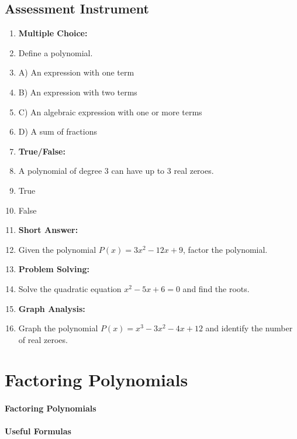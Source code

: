 \subsection{Assessment Instrument}

\begin{enumerate}
    \item \textbf{Multiple Choice:}
    \item Define a polynomial.
    \item A) An expression with one term
    \item B) An expression with two terms
    \item C) An algebraic expression with one or more terms
    \item D) A sum of fractions
    \item \textbf{True/False:}
    \item A polynomial of degree 3 can have up to 3 real zeroes.
    \item True
    \item False
    \item \textbf{Short Answer:}
    \item Given the polynomial \( P(x) = 3x^2 - 12x + 9 \), factor the polynomial.
    \item \textbf{Problem Solving:}
    \item Solve the quadratic equation \( x^2 - 5x + 6 = 0 \) and find the roots.
    \item \textbf{Graph Analysis:}
    \item Graph the polynomial \( P(x) = x^3 - 3x^2 - 4x + 12 \) and identify the number of real zeroes.
\end{enumerate}

\section{Factoring Polynomials}
\label{sec:factoring-polynomials}

\paragraph{Factoring Polynomials}

\paragraph{Useful Formulas}

